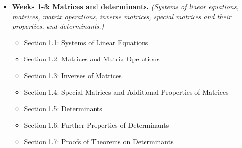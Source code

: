 \documentclass[10pt]{article}
\theoremstyle{definition}
\begin{document}
\begin{itemize}
  \item \textbf{Weeks 1-3: Matrices and determinants.} \textit{(Systems of linear
  equations, matrices, matrix operations, inverse matrices, special matrices
  and their properties, and determinants.)}
  \begin{itemize} 
    \item Section 1.1: Systems of Linear Equations
    \item Section 1.2: Matrices and Matrix Operations
    \item Section 1.3: Inverses of Matrices
    \item Section 1.4: Special Matrices and Additional Properties of Matrices
    \item Section 1.5: Determinants
    \item Section 1.6: Further Properties of Determinants
    \item Section 1.7: Proofs of Theorems on Determinants
  \end{itemize}


\end{itemize}
\end{document}
